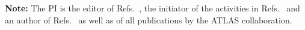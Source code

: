 \documentclass[11pt,a4paper]{article}
\begin{document}

\clearpage




{\bf Note:} The PI is the editor of Refs.~\cite{Boveia:2018yeb,Abercrombie:2015wmb,Aaboud:2018fzt,Aaboud:2019zxd,Doglioni:2019fza}, the initiator of the activities in Refs.~\cite{DMWGWebsite,iDMEu} and an author of Refs.~\cite{Strategy:2019vxc,Alves:2017she} as well as of all publications by the ATLAS collaboration.
\end{document}
